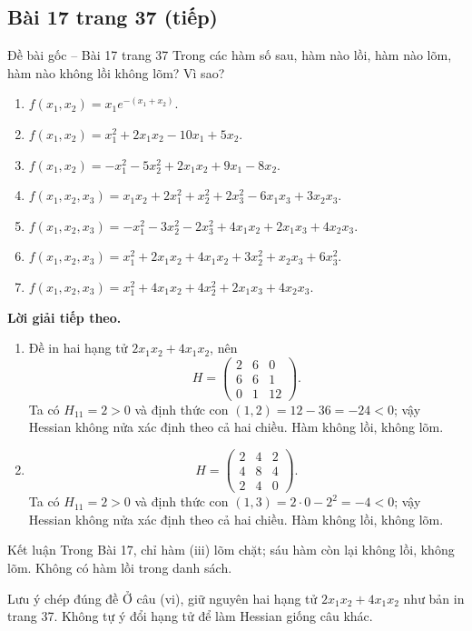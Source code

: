 \documentclass[11pt,a4paper]{article}
\begin{document}
\subsection*{Bài 17 trang 37 (tiếp)}
\begin{questionbox}{Đề bài gốc -- Bài 17 trang 37}
Trong các hàm số sau, hàm nào lồi, hàm nào lõm, hàm nào không lồi không lõm? Vì sao?
\begin{enumerate}[label=\roman*),nosep,leftmargin=*]
\item \(f(x_1,x_2)=x_1e^{-(x_1+x_2)}\).
\item \(f(x_1,x_2)=x_1^2+2x_1x_2-10x_1+5x_2\).
\item \(f(x_1,x_2)=-x_1^2-5x_2^2+2x_1x_2+9x_1-8x_2\).
\item \(f(x_1,x_2,x_3)=x_1x_2+2x_1^2+x_2^2+2x_3^2-6x_1x_3+3x_2x_3\).
\item \(f(x_1,x_2,x_3)=-x_1^2-3x_2^2-2x_3^2+4x_1x_2+2x_1x_3+4x_2x_3\).
\item \(f(x_1,x_2,x_3)=x_1^2+2x_1x_2+4x_1x_2+3x_2^2+x_2x_3+6x_3^2\).
\item \(f(x_1,x_2,x_3)=x_1^2+4x_1x_2+4x_2^2+2x_1x_3+4x_2x_3\).
\end{enumerate}
\end{questionbox}
\textbf{Lời giải tiếp theo.}
\begin{enumerate}[label=\roman*),start=6,leftmargin=*,itemsep=.45em]
\item Đề in hai hạng tử \(2x_1x_2+4x_1x_2\), nên
\[
H=\begin{pmatrix}2&6&0\\6&6&1\\0&1&12\end{pmatrix}.
\]
Ta có \(H_{11}=2>0\) và định thức con \((1,2)=12-36=-24<0\); vậy Hessian không nửa xác định theo cả hai chiều. Hàm không lồi, không lõm.
\item \[
H=\begin{pmatrix}2&4&2\\4&8&4\\2&4&0\end{pmatrix}.
\]
Ta có \(H_{11}=2>0\) và định thức con \((1,3)=2\cdot0-2^2=-4<0\); vậy Hessian không nửa xác định theo cả hai chiều. Hàm không lồi, không lõm.
\end{enumerate}
\begin{answerbox}{Kết luận}
Trong Bài 17, chỉ hàm (iii) lõm chặt; sáu hàm còn lại không lồi, không lõm. Không có hàm lồi trong danh sách.
\end{answerbox}
\begin{warningbox}{Lưu ý chép đúng đề}
Ở câu (vi), giữ nguyên hai hạng tử \(2x_1x_2+4x_1x_2\) như bản in trang 37. Không tự ý đổi hạng tử để làm Hessian giống câu khác.
\end{warningbox}
\end{document}
